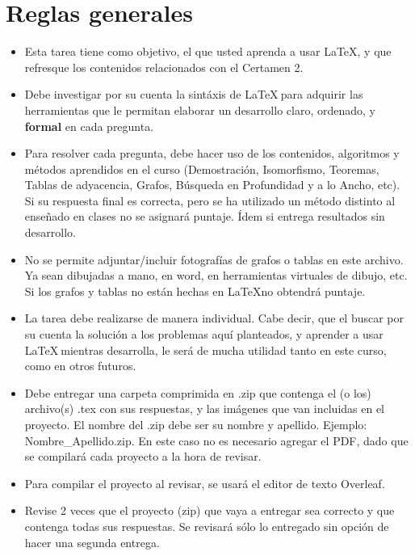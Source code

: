 \documentclass[letterpaper,10pt]{article}
\begin{document}
\section{Reglas generales}
\begin{itemize}
    \item Esta tarea tiene como objetivo, el que usted aprenda a usar \LaTeX, y que refresque los contenidos relacionados con el Certamen 2. 
    \item Debe investigar por su cuenta la sintáxis de \LaTeX $~$para adquirir las herramientas que le permitan elaborar un desarrollo claro, ordenado, y \textbf{formal} en cada pregunta.
    
    \item Para resolver cada pregunta, debe hacer uso de los contenidos, algoritmos y métodos aprendidos en el curso (Demostración, Isomorfismo, Teoremas, Tablas de adyacencia, Grafos, Búsqueda en Profundidad y a lo Ancho, etc). Si su respuesta final es correcta, pero se ha utilizado un método distinto al enseñado en clases no se asignará puntaje. Ídem si entrega resultados sin desarrollo. 
    
    \item No se permite adjuntar/incluir fotografías de grafos o tablas en este archivo. Ya sean dibujadas a mano, en word, en herramientas virtuales de dibujo, etc. Si los grafos y tablas no están hechas en \LaTeX no obtendrá puntaje. 
    
    \item La tarea debe realizarse de manera individual. Cabe decir, que el buscar por su cuenta la solución a los problemas aquí planteados, y aprender a usar \LaTeX  $~$mientras desarrolla, le será de mucha utilidad tanto en este curso, como en otros futuros.
    
    \item Debe entregar una carpeta comprimida en .zip que contenga el (o los) archivo(s) .tex con sus respuestas, y las imágenes que van incluidas en el proyecto. El nombre del .zip debe ser su nombre y apellido. Ejemplo:\\ Nombre\_Apellido.zip. En este caso no es necesario agregar el PDF, dado que se compilará cada proyecto a la hora de revisar.
    
    \item Para compilar el proyecto al revisar, se usará el editor de texto Overleaf.
    
    \item Revise 2 veces que el proyecto (zip) que vaya a entregar sea correcto y que contenga todas sus respuestas. Se revisará sólo lo entregado sin opción de hacer una segunda entrega.
    

\end{itemize}
\end{document}

